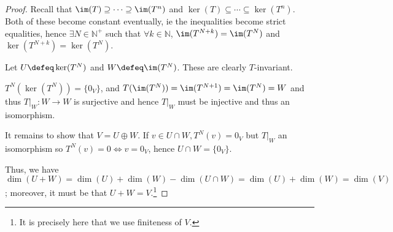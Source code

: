 \begin{proof}
    Recall that $\im(T) \supseteq \cdots \supseteq \im(T^n)$ and $\ker(T) \subseteq \cdots \subseteq \ker(T^n)$. Both of these become constant eventually, ie the inequalities become strict equalities, hence $\exists N \in \mathbb{N}^+$ such that $\forall k \in \mathbb{N}$, $\im(T^{N+k}) = \im(T^N)$ and $\ker(T^{N+k}) = \ker(T^{N})$.

    Let $U \defeq \ker(T^N)$ and $W \defeq \im(T^N)$. These are clearly $T$-invariant. 

    $T^N(\ker(T^N)) = \{0_V\}$, and $T(\im(T^N)) = \im(T^{N+1}) =\im(T^N) = W$ and thus $T\vert_W : W \to W$ is surjective and hence $T\vert_W$ must be injective and thus an isomorphism.

    It remains to show that $V = U \oplus W$. If $v \in U \cap W, T^N(v) = 0_V$ but $T\vert_W$ an isomorphism so $T^N(v) = 0 \iff v = 0_V$, hence $U \cap W = \{0_V\}$.

    Thus, we have $\dim(U + W) = \dim(U) + \dim(W) - \dim(U \cap W) = \dim(U) + \dim(W) = \dim(V)$; moreover, it must be that $U + W = V$.\footnote{It is precisely here that we use finiteness of $V$.}
\end{proof}